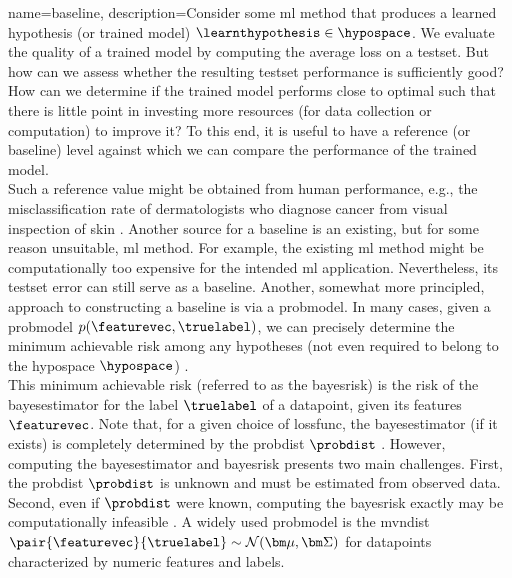 {name={baseline},
    description={Consider some \gls{ml} method that produces a learned 
    	\gls{hypothesis} (or trained \gls{model}) $\learnthypothesis \in \hypospace$. We evaluate the quality of a trained \gls{model} 
    	by computing the average \gls{loss} on a \gls{testset}. But how can we assess 
    	whether the resulting \gls{testset} performance is sufficiently good? How can we 
    	determine if the trained \gls{model} performs close to optimal such that there is little point 
   	in investing more resources (for \gls{data} collection or computation) to improve it? 
    	To this end, it is useful to have a reference (or baseline) level against which 
    	we can compare the performance of the trained \gls{model}. \\
	Such a reference value might be obtained from human performance, e.g., the misclassification rate of dermatologists 
    	who diagnose cancer from visual inspection of skin \cite{SkinHumanAI}. Another source for a baseline is an existing, 
    	but for some reason unsuitable, \gls{ml} method. For example, the existing \gls{ml} method 
    	might be computationally too expensive for the intended \gls{ml} application. 
    	Nevertheless, its \gls{testset} error can still serve as a baseline. Another, somewhat more principled, 
    	approach to constructing a baseline is via a \gls{probmodel}. In many cases, given a \gls{probmodel} $p(\featurevec,\truelabel)$,  
    	we can precisely determine the \gls{minimum} achievable \gls{risk} among any hypotheses
    	(not even required to belong to the \gls{hypospace} $\hypospace$) \cite{LC}. \\
    	This \gls{minimum} achievable \gls{risk} (referred to as the \gls{bayesrisk}) is the \gls{risk} 
    	of the \gls{bayesestimator} for the \gls{label} $\truelabel$ of a \gls{datapoint}, given
    	its \glspl{feature} $\featurevec$. Note that, for a given choice of \gls{lossfunc}, the 
    	\gls{bayesestimator} (if it exists) is completely determined by the \gls{probdist} 
		$\probdist$ \cite[Ch. 4]{LC}. However, computing the \gls{bayesestimator} 
		and \gls{bayesrisk} presents two main challenges. First, the \gls{probdist} 
		$\probdist$ is unknown and 
		must be estimated from observed \gls{data}. Second, even if $\probdist$ 
		were known, computing the \gls{bayesrisk} exactly may be computationally 
		infeasible \cite{cooper1990computational}. 
	A widely used \gls{probmodel} is the \gls{mvndist} $\pair{\featurevec}{\truelabel} \sim \mathcal{N}({\bm \mu},{\bm \Sigma})$ 
	for \glspl{datapoint} characterized by numeric \glspl{feature} and \glspl{label}.
}}
